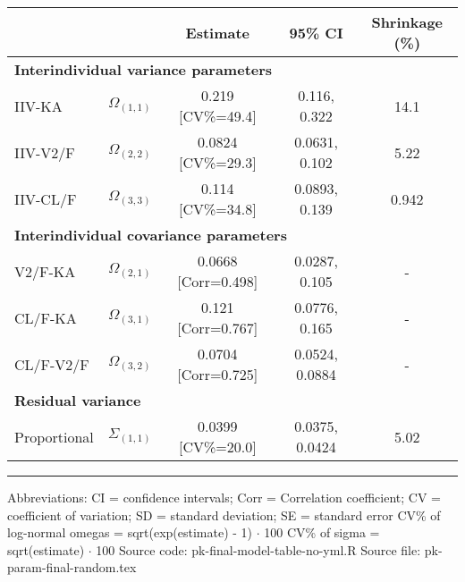 \setlength{\tabcolsep}{5pt} 
\begin{threeparttable}
\renewcommand{\arraystretch}{1.3}
\begin{tabular}[h]{lcccc}
\hline
 &  & Estimate & 95\% CI & Shrinkage (\%) \\
\hline
\multicolumn{5}{l}{\textbf{Interindividual variance parameters}}\\%
IIV-KA & $\Omega_{(1,1)}$ & 0.219 [CV\%=49.4] & 0.116, 0.322 & 14.1 \\
IIV-V2/F & $\Omega_{(2,2)}$ & 0.0824 [CV\%=29.3] & 0.0631, 0.102 & 5.22 \\
IIV-CL/F & $\Omega_{(3,3)}$ & 0.114 [CV\%=34.8] & 0.0893, 0.139 & 0.942 \\
\hline \multicolumn{5}{l}{\textbf{Interindividual covariance parameters}}\\%
V2/F-KA & $\Omega_{(2,1)}$ & 0.0668 [Corr=0.498] & 0.0287, 0.105 & - \\
CL/F-KA & $\Omega_{(3,1)}$ & 0.121 [Corr=0.767] & 0.0776, 0.165 & - \\
CL/F-V2/F & $\Omega_{(3,2)}$ & 0.0704 [Corr=0.725] & 0.0524, 0.0884 & - \\
\hline \multicolumn{5}{l}{\textbf{Residual variance}}\\%
Proportional & $\Sigma_{(1,1)}$ & 0.0399 [CV\%=20.0] & 0.0375, 0.0424 & 5.02 \\
\hline
\end{tabular}
\end{threeparttable}
 
\vspace{0.67cm}
 
\begin{minipage}{1\linewidth}
\linespread{1.1}\selectfont
\rule{1\linewidth}{0.4pt}
\vspace{0.02cm}
Abbreviations: CI = confidence intervals; 
                        Corr = Correlation coefficient;
                        CV = coefficient of variation;
                        SD = standard deviation;
                        SE = standard error \newline
CV\% of log-normal omegas = sqrt(exp(estimate) - 1) $\cdot$ 100 \newline
CV\% of sigma = sqrt(estimate) $\cdot$ 100 \newline
Source code: pk-final-model-table-no-yml.R \newline
Source file: pk-param-final-random.tex \newline
\end{minipage}
